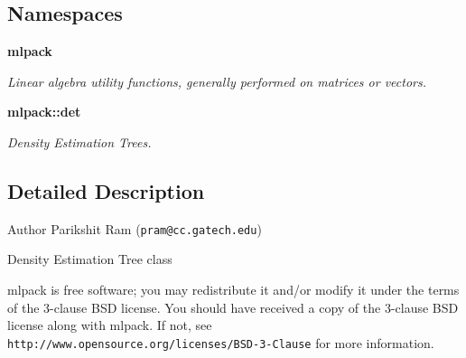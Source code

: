 \subsection*{Namespaces}
\begin{DoxyCompactItemize}
\item 
 {\bf mlpack}
\begin{DoxyCompactList}\small\item\em Linear algebra utility functions, generally performed on matrices or vectors. \end{DoxyCompactList}\item 
 {\bf mlpack\+::det}
\begin{DoxyCompactList}\small\item\em Density Estimation Trees. \end{DoxyCompactList}\end{DoxyCompactItemize}


\subsection{Detailed Description}
\begin{DoxyAuthor}{Author}
Parikshit Ram ({\tt pram@cc.\+gatech.\+edu})
\end{DoxyAuthor}
Density Estimation Tree class

mlpack is free software; you may redistribute it and/or modify it under the terms of the 3-\/clause B\+SD license. You should have received a copy of the 3-\/clause B\+SD license along with mlpack. If not, see {\tt http\+://www.\+opensource.\+org/licenses/\+B\+S\+D-\/3-\/\+Clause} for more information. 